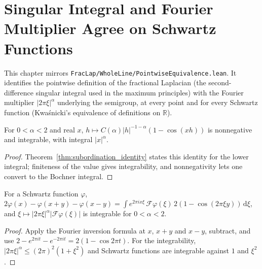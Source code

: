 \chapter{Singular Integral and Fourier Multiplier Agree on Schwartz Functions}

This chapter mirrors \texttt{FracLap/WholeLine/PointwiseEquivalence.lean}. It identifies the pointwise definition of the fractional Laplacian (the second-difference singular integral used in the maximum principles) with the Fourier multiplier $\lvert 2\pi\xi\rvert^{\alpha}$ underlying the semigroup, at every point and for every Schwartz function (Kwa\'snicki's equivalence of definitions on $\mathbb{R}$).

\begin{lemma}\label{lem:cos_kernel}
\leanok
For $0 < \alpha < 2$ and real $x$, $h \mapsto C(\alpha) \lvert h\rvert^{-1-\alpha}(1 - \cos(xh))$ is nonnegative and integrable, with integral $\lvert x\rvert^{\alpha}$.
\end{lemma}

\begin{proof}
\leanok
Theorem~\ref{thm:subordination_identity} states this identity for the lower integral; finiteness of the value gives integrability, and nonnegativity lets one convert to the Bochner integral.
\end{proof}

\begin{lemma}\label{lem:second_diff_fourier}
\leanok
For a Schwartz function $\varphi$, $2\varphi(x) - \varphi(x+y) - \varphi(x-y) = \int e^{2\pi i x\xi}\,\mathcal{F}\varphi(\xi)\, 2(1 - \cos(2\pi\xi y))\, \mathrm{d}\xi$, and $\xi \mapsto \lvert 2\pi\xi\rvert^{\alpha}\lvert\mathcal{F}\varphi(\xi)\rvert$ is integrable for $0 < \alpha < 2$.
\end{lemma}

\begin{proof}
\leanok
Apply the Fourier inversion formula at $x$, $x + y$ and $x - y$, subtract, and use $2 - e^{2\pi i t} - e^{-2\pi i t} = 2(1 - \cos 2\pi t)$. For the integrability, $\lvert 2\pi\xi\rvert^{\alpha} \le (2\pi)^2(1 + \xi^2)$ and Schwartz functions are integrable against $1$ and $\xi^2$.
\end{proof}


